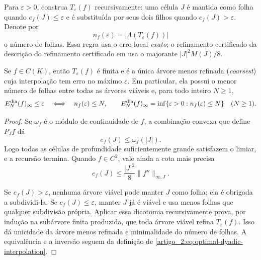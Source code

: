 Para $\varepsilon>0$, construa $T_\varepsilon(f)$ recursivamente: uma célula
$J$ é mantida como folha quando $e_f(J)\le\varepsilon$ e é substituída por
seus dois filhos quando $e_f(J)>\varepsilon$. Denote por
\begin{equation}
 n_f(\varepsilon)=|\Lambda(T_\varepsilon(f))|
 \label{artigo_2:eq:threshold-count}
\end{equation}
o número de folhas. Essa regra usa o erro local \emph{exato}; o refinamento
certificado da descrição do refinamento certificado em \citet{artigo_2-oliveiraI} usa o majorante $|J|^2M(J)/8$.

\begin{theorem}\label{map:artigo_2:11.1}
\label{artigo_2:thm:threshold-optimality}
Se $f\in C(K)$, então $T_\varepsilon(f)$ é finita e é a única árvore
menos refinada (\emph{coarsest}) cuja interpolação tem erro no máximo $\varepsilon$. Em particular,
ela possui o menor número de folhas entre todas as árvores viáveis e, para todo inteiro $N\ge1$,
\begin{equation}
 E_N^{\rm dia}(f)_\infty\le\varepsilon
 \quad\Longleftrightarrow\quad
 n_f(\varepsilon)\le N,
 \qquad
 E_N^{\rm dia}(f)_\infty
 =\inf\{\varepsilon>0:n_f(\varepsilon)\le N\}\quad(N\ge1).
 \label{artigo_2:eq:threshold-inversion}
\end{equation}
\end{theorem}

\begin{proof}
Se $\omega_f$ é o módulo de continuidade de $f$, a combinação convexa que
define $P_Jf$ dá
\[
 e_f(J)\le\omega_f(|J|).
\]
Logo todas as células de profundidade suficientemente grande satisfazem o
limiar, e a recursão termina. Quando $f\in C^2$, vale ainda a cota mais
precisa
\begin{equation}
 e_f(J)\le \frac{|J|^2}{8}\|f''\|_{\infty,J}.
 \label{artigo_2:eq:local-upper-basic}
\end{equation}

Se $e_f(J)>\varepsilon$, nenhuma árvore viável pode manter $J$ como folha;
ela é obrigada a subdividi-la. Se $e_f(J)\le\varepsilon$, manter $J$ já é
viável e usa menos folhas que qualquer subdivisão própria. Aplicar essa
dicotomia recursivamente prova, por indução na subárvore finita produzida,
que toda árvore viável refina $T_\varepsilon(f)$. Isso dá unicidade da árvore menos
refinada e minimalidade do número de folhas. A equivalência e a inversão seguem da
definição de \eqref{artigo_2:eq:optimal-dyadic-interpolation}.
\end{proof}

